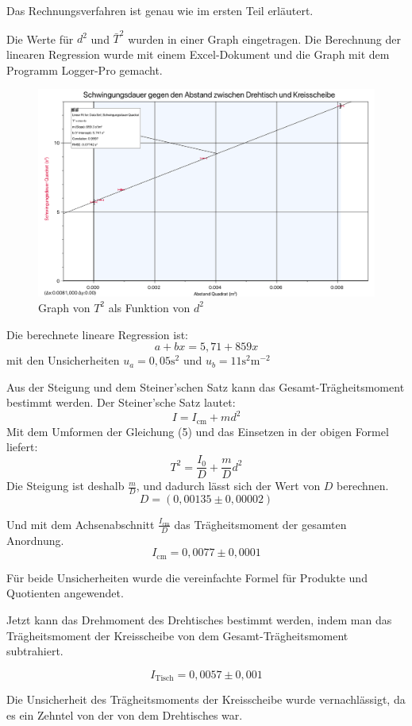 \documentclass[11pt,a4paper]{article} %
\begin{document}
Das Rechnungsverfahren ist genau wie im ersten Teil erläutert. 

Die Werte für $d^2$ und $\bar{T}^2$ wurden in einer Graph eingetragen. Die Berechnung der linearen Regression wurde mit einem Excel-Dokument und die Graph mit dem Programm Logger-Pro gemacht. 
\begin{figure}[h]
	\centering
	\includegraphics[width=\linewidth]{Graph1}
	\caption{Graph von $T^2$ als Funktion von $d^2$}
\end{figure}
Die berechnete lineare Regression ist:
$$a+bx = 5,71 + 859x$$
mit den Unsicherheiten $u_a = 0,05 \textrm{s}^2$ und $u_b = 11 \textrm{s}^2 \textrm{m}^{-2}$

Aus der Steigung und dem Steiner'schen Satz kann das Gesamt-Trägheitsmoment bestimmt werden. Der Steiner'sche Satz lautet:
$$ I = I_\textrm{cm} + md^2 $$
Mit dem Umformen der Gleichung (5) und das Einsetzen in der obigen Formel liefert:
$$T^2 = \frac{I_0}{D} + \frac{m}{D}d^2$$
Die Steigung ist deshalb $\frac{m}{D}$, und dadurch lässt sich der Wert von $D$ berechnen. 
$$D = (0,00135 \pm 0,00002)$$

Und mit dem Achsenabschnitt $\frac{I_\textrm{cm}}{D}$ das Trägheitsmoment der gesamten Anordnung. 
$$ I_\textrm{cm} = 0,0077 \pm 0,0001 $$

Für beide Unsicherheiten wurde die vereinfachte Formel für Produkte und Quotienten angewendet.

Jetzt kann das Drehmoment des Drehtisches bestimmt werden, indem man das Trägheitsmoment der Kreisscheibe von dem Gesamt-Trägheitsmoment subtrahiert. 

$$I_\textrm{Tisch} = 0,0057 \pm 0,001 $$

Die Unsicherheit des Trägheitsmoments der Kreisscheibe wurde vernachlässigt, da es ein Zehntel von der von dem Drehtisches war. 
\end{document}
